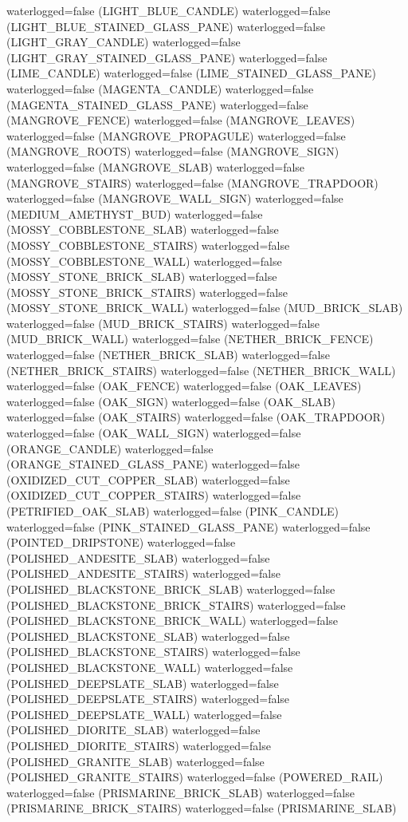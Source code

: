\documentclass[11pt]{article}
\begin{document}
waterlogged=false (LIGHT_BLUE_CANDLE)
waterlogged=false (LIGHT_BLUE_STAINED_GLASS_PANE)
waterlogged=false (LIGHT_GRAY_CANDLE)
waterlogged=false (LIGHT_GRAY_STAINED_GLASS_PANE)
waterlogged=false (LIME_CANDLE)
waterlogged=false (LIME_STAINED_GLASS_PANE)
waterlogged=false (MAGENTA_CANDLE)
waterlogged=false (MAGENTA_STAINED_GLASS_PANE)
waterlogged=false (MANGROVE_FENCE)
waterlogged=false (MANGROVE_LEAVES)
waterlogged=false (MANGROVE_PROPAGULE)
waterlogged=false (MANGROVE_ROOTS)
waterlogged=false (MANGROVE_SIGN)
waterlogged=false (MANGROVE_SLAB)
waterlogged=false (MANGROVE_STAIRS)
waterlogged=false (MANGROVE_TRAPDOOR)
waterlogged=false (MANGROVE_WALL_SIGN)
waterlogged=false (MEDIUM_AMETHYST_BUD)
waterlogged=false (MOSSY_COBBLESTONE_SLAB)
waterlogged=false (MOSSY_COBBLESTONE_STAIRS)
waterlogged=false (MOSSY_COBBLESTONE_WALL)
waterlogged=false (MOSSY_STONE_BRICK_SLAB)
waterlogged=false (MOSSY_STONE_BRICK_STAIRS)
waterlogged=false (MOSSY_STONE_BRICK_WALL)
waterlogged=false (MUD_BRICK_SLAB)
waterlogged=false (MUD_BRICK_STAIRS)
waterlogged=false (MUD_BRICK_WALL)
waterlogged=false (NETHER_BRICK_FENCE)
waterlogged=false (NETHER_BRICK_SLAB)
waterlogged=false (NETHER_BRICK_STAIRS)
waterlogged=false (NETHER_BRICK_WALL)
waterlogged=false (OAK_FENCE)
waterlogged=false (OAK_LEAVES)
waterlogged=false (OAK_SIGN)
waterlogged=false (OAK_SLAB)
waterlogged=false (OAK_STAIRS)
waterlogged=false (OAK_TRAPDOOR)
waterlogged=false (OAK_WALL_SIGN)
waterlogged=false (ORANGE_CANDLE)
waterlogged=false (ORANGE_STAINED_GLASS_PANE)
waterlogged=false (OXIDIZED_CUT_COPPER_SLAB)
waterlogged=false (OXIDIZED_CUT_COPPER_STAIRS)
waterlogged=false (PETRIFIED_OAK_SLAB)
waterlogged=false (PINK_CANDLE)
waterlogged=false (PINK_STAINED_GLASS_PANE)
waterlogged=false (POINTED_DRIPSTONE)
waterlogged=false (POLISHED_ANDESITE_SLAB)
waterlogged=false (POLISHED_ANDESITE_STAIRS)
waterlogged=false (POLISHED_BLACKSTONE_BRICK_SLAB)
waterlogged=false (POLISHED_BLACKSTONE_BRICK_STAIRS)
waterlogged=false (POLISHED_BLACKSTONE_BRICK_WALL)
waterlogged=false (POLISHED_BLACKSTONE_SLAB)
waterlogged=false (POLISHED_BLACKSTONE_STAIRS)
waterlogged=false (POLISHED_BLACKSTONE_WALL)
waterlogged=false (POLISHED_DEEPSLATE_SLAB)
waterlogged=false (POLISHED_DEEPSLATE_STAIRS)
waterlogged=false (POLISHED_DEEPSLATE_WALL)
waterlogged=false (POLISHED_DIORITE_SLAB)
waterlogged=false (POLISHED_DIORITE_STAIRS)
waterlogged=false (POLISHED_GRANITE_SLAB)
waterlogged=false (POLISHED_GRANITE_STAIRS)
waterlogged=false (POWERED_RAIL)
waterlogged=false (PRISMARINE_BRICK_SLAB)
waterlogged=false (PRISMARINE_BRICK_STAIRS)
waterlogged=false (PRISMARINE_SLAB)
\end{document}
